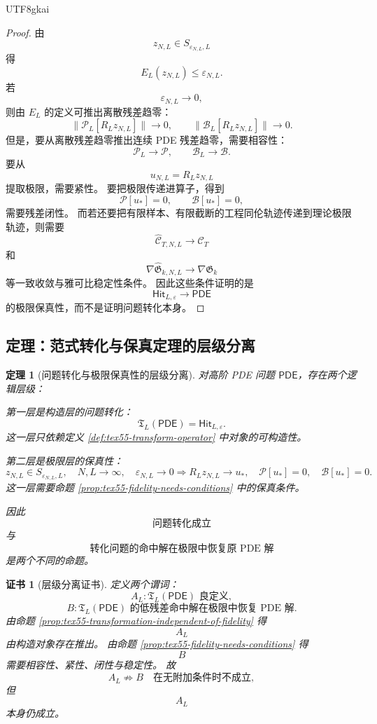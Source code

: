 \documentclass[12pt]{article}
\newtheorem{theorem}{定理}[section]
\newtheorem{Certificate}{证书}[section]
\begin{document}
\begin{CJK*}{UTF8}{gkai}
\begin{proof}
由
\[
  z_{N,L}\in S_{\varepsilon_{N,L},L}
\]
得
\[
  E_L(z_{N,L})\le\varepsilon_{N,L}.
\]
若
\[
  \varepsilon_{N,L}\to0,
\]
则由 \(E_L\) 的定义可推出离散残差趋零：
\[
  \lVert \mathcal P_L[R_Lz_{N,L}]\rVert\to0,
  \qquad
  \lVert \mathcal B_L[R_Lz_{N,L}]\rVert\to0.
\]
但是，要从离散残差趋零推出连续 PDE 残差趋零，需要相容性：
\[
  \mathcal P_L\to\mathcal P,
  \qquad
  \mathcal B_L\to\mathcal B.
\]
要从
\[
  u_{N,L}=R_Lz_{N,L}
\]
提取极限，需要紧性。
要把极限传递进算子，得到
\[
  \mathcal P[u_*]=0,
  \qquad
  \mathcal B[u_*]=0,
\]
需要残差闭性。
而若还要把有限样本、有限截断的工程同伦轨迹传递到理论极限轨迹，则需要
\[
  \widehat{\mathcal C}_{T,N,L}
  \to
  \mathcal C_T
\]
和
\[
  \nabla\widehat{\mathfrak G}_{k,N,L}
  \to
  \nabla\mathfrak G_k
\]
等一致收敛与雅可比稳定性条件。
因此这些条件证明的是
\[
  \mathsf{Hit}_{L,\varepsilon}
  \to
  \mathsf{PDE}
\]
的极限保真性，而不是证明问题转化本身。
\end{proof}

\subsection{定理：范式转化与保真定理的层级分离}
\label{subsec:tex55-transformation-fidelity-theorem}

\begin{theorem}[问题转化与极限保真性的层级分离]
\label{thm:tex55-transformation-fidelity-separation}
对高阶 PDE 问题 \(\mathsf{PDE}\)，存在两个逻辑层级：

第一层是构造层的问题转化：
\[
  \mathfrak T_L(\mathsf{PDE})
  =
  \mathsf{Hit}_{L,\varepsilon}.
\]
这一层只依赖定义 \ref{def:tex55-transform-operator} 中对象的可构造性。

第二层是极限层的保真性：
\[
  z_{N,L}\in S_{\varepsilon_{N,L},L},
  \quad
  N,L\to\infty,
  \quad
  \varepsilon_{N,L}\to0
  \Longrightarrow
  R_Lz_{N,L}\to u_*,
  \quad
  \mathcal P[u_*]=0,
  \quad
  \mathcal B[u_*]=0.
\]
这一层需要命题 \ref{prop:tex55-fidelity-needs-conditions} 中的保真条件。

因此
\[
  \boxed{
  \text{问题转化成立}
  }
\]
与
\[
  \boxed{
  \text{转化问题的命中解在极限中恢复原 PDE 解}
  }
\]
是两个不同的命题。
\end{theorem}

\begin{Certificate}[层级分离证书]
\label{cert:tex55-transformation-fidelity-separation}
定义两个谓词：
\[
  A_L:
  \mathfrak T_L(\mathsf{PDE})
  \text{ 良定义},
\]
\[
  B:
  \mathfrak T_L(\mathsf{PDE})
  \text{ 的低残差命中解在极限中恢复 PDE 解}.
\]
由命题 \ref{prop:tex55-transformation-independent-of-fidelity} 得
\[
  A_L
\]
由构造对象存在推出。
由命题 \ref{prop:tex55-fidelity-needs-conditions} 得
\[
  B
\]
需要相容性、紧性、闭性与稳定性。
故
\[
  A_L
  \not\Rightarrow
  B
  \quad
  \text{在无附加条件时不成立},
\]
但
\[
  A_L
\]
本身仍成立。
\end{Certificate}


\end{CJK*}
\end{document}

